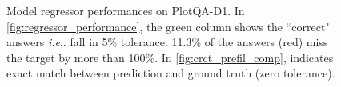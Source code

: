 \documentclass[runningheads]{llncs}
\makeatletter
\DeclareRobustCommand\onedot{\futurelet\@let@token\@onedot}
\def\@onedot{\ifx\@let@token.\else.\null\fi\xspace}
\def\ie{\emph{i.e}\onedot} \def\Ie{\emph{I.e}\onedot}
\makeatother
\begin{document}
\begin{figure}[ht]\centering
    \hfill
    \caption{Model regressor performances on PlotQA-D1. In \ref{fig:regressor_performance}, the green column shows the ``correct" answers \ie fall in 5\% tolerance. 11.3\% of the answers (red) miss the target by more than 100\%. In \ref{fig:crct_prefil_comp},  indicates exact match between prediction and ground truth (zero tolerance).}
\end{figure}
\end{document}

